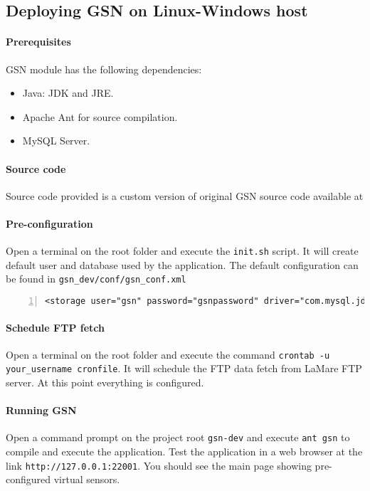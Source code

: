 \subsection{Deploying GSN on Linux-Windows host}
\paragraph{Prerequisites} GSN module has the following dependencies:
\begin{itemize}
	\item Java: JDK and JRE.
	\item Apache Ant for source compilation.
	\item MySQL Server.
\end{itemize}
\paragraph{Source code} Source code provided is a custom version of original GSN 
source code available at \cite{epfl1}
\paragraph{Pre-configuration} Open a terminal on the root folder and execute the {\tt init.sh} script. It will create
 default user and database used by the application. The default configuration can be found in {\tt gsn\_dev/conf/gsn\_conf.xml}
\begin{lstlisting}[numbers=left, breaklines=true]
<storage user="gsn" password="gsnpassword" driver="com.mysql.jdbc.Driver" url="jdbc:mysql://localhost/gsn" />
\end{lstlisting}
\paragraph{Schedule FTP fetch} Open a terminal on the root folder and execute the command {\tt crontab -u your\_username cronfile}. It will schedule the FTP data fetch from LaMare FTP server. At this point everything is configured.
\paragraph{Running GSN} Open a command prompt on the project root {\tt gsn-dev} and execute 
{\tt ant gsn} to compile and execute the application. Test the application in a web browser at the link
{\tt http://127.0.0.1:22001}. You should see the main page showing pre-configured virtual sensors.